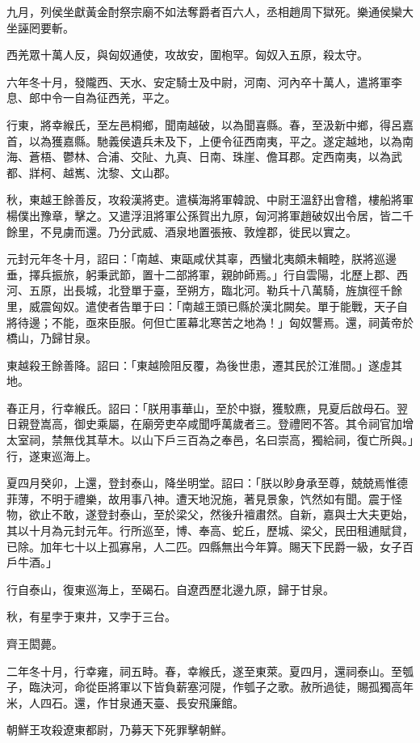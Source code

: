 \begin{pinyinscope}
九月，列侯坐獻黃金酎祭宗廟不如法奪爵者百六人，丞相趙周下獄死。樂通侯欒大坐誣罔要斬。

西羌眾十萬人反，與匈奴通使，攻故安，圍枹罕。匈奴入五原，殺太守。

六年冬十月，發隴西、天水、安定騎士及中尉，河南、河內卒十萬人，遣將軍李息、郎中令一自為征西羌，平之。

行東，將幸緱氏，至左邑桐鄉，聞南越破，以為聞喜縣。春，至汲新中鄉，得呂嘉首，以為獲嘉縣。馳義侯遺兵未及下，上便令征西南夷，平之。遂定越地，以為南海、蒼梧、鬱林、合浦、交阯、九真、日南、珠崖、儋耳郡。定西南夷，以為武都、牂柯、越嶲、沈黎、文山郡。

秋，東越王餘善反，攻殺漢將吏。遣橫海將軍韓說、中尉王溫舒出會稽，樓船將軍楊僕出豫章，擊之。又遣浮沮將軍公孫賀出九原，匈河將軍趙破奴出令居，皆二千餘里，不見虜而還。乃分武威、酒泉地置張掖、敦煌郡，徙民以實之。

元封元年冬十月，詔曰：「南越、東甌咸伏其辜，西蠻北夷頗未輯睦，朕將巡邊垂，擇兵振旅，躬秉武節，置十二部將軍，親帥師焉。」行自雲陽，北歷上郡、西河、五原，出長城，北登單于臺，至朔方，臨北河。勒兵十八萬騎，旌旗徑千餘里，威震匈奴。遣使者告單于曰：「南越王頭已縣於漢北闕矣。單于能戰，天子自將待邊；不能，亟來臣服。何但亡匿幕北寒苦之地為！」匈奴讋焉。還，祠黃帝於橋山，乃歸甘泉。

東越殺王餘善降。詔曰：「東越險阻反覆，為後世患，遷其民於江淮間。」遂虛其地。

春正月，行幸緱氏。詔曰：「朕用事華山，至於中嶽，獲駮麃，見夏后啟母石。翌日親登嵩高，御史乘屬，在廟旁吏卒咸聞呼萬歲者三。登禮罔不答。其令祠官加增太室祠，禁無伐其草木。以山下戶三百為之奉邑，名曰崇高，獨給祠，復亡所與。」行，遂東巡海上。

夏四月癸卯，上還，登封泰山，降坐明堂。詔曰：「朕以眇身承至尊，兢兢焉惟德菲薄，不明于禮樂，故用事八神。遭天地況施，著見景象，饩然如有聞。震于怪物，欲止不敢，遂登封泰山，至於梁父，然後升襢肅然。自新，嘉與士大夫更始，其以十月為元封元年。行所巡至，博、奉高、蛇丘，歷城、梁父，民田租逋賦貸，已除。加年七十以上孤寡帛，人二匹。四縣無出今年算。賜天下民爵一級，女子百戶牛酒。」

行自泰山，復東巡海上，至碣石。自遼西歷北邊九原，歸于甘泉。

秋，有星孛于東井，又孛于三台。

齊王閎薨。

二年冬十月，行幸雍，祠五畤。春，幸緱氏，遂至東萊。夏四月，還祠泰山。至瓠子，臨決河，命從臣將軍以下皆負薪塞河隄，作瓠子之歌。赦所過徒，賜孤獨高年米，人四石。還，作甘泉通天臺、長安飛廉館。

朝鮮王攻殺遼東都尉，乃募天下死罪擊朝鮮。


\end{pinyinscope}
